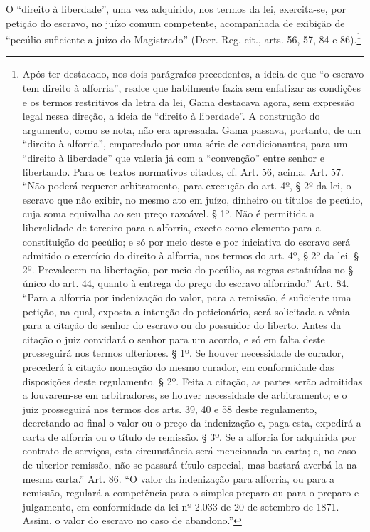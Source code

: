O ``direito à liberdade'', uma vez adquirido, nos termos da lei,
exercita-se, por petição do escravo, no juízo comum competente,
acompanhada de exibição de ``pecúlio suficiente a juízo do Magistrado''
(Decr. Reg. cit., arts. 56, 57, 84 e 86).\footnote{Após ter destacado,
  nos dois parágrafos precedentes, a ideia de que ``o escravo tem direito
  à alforria'', realce que habilmente fazia sem enfatizar as condições e
  os termos restritivos da letra da lei, Gama destacava agora, sem
  expressão legal nessa direção, a ideia de ``direito à liberdade''. A
  construção do argumento, como se nota, não era apressada. Gama
  passava, portanto, de um ``direito à alforria'', emparedado por uma série
  de condicionantes, para um ``direito à liberdade'' que valeria já com a
  ``convenção'' entre senhor e libertando. Para os textos normativos
  citados, cf. Art. 56, acima. Art. 57. ``Não
  poderá requerer arbitramento, para execução do art. 4º, § 2º da lei, o
  escravo que não exibir, no mesmo ato em juízo, dinheiro ou títulos de
  pecúlio, cuja soma equivalha ao seu preço razoável. § 1º. Não é
  permitida a liberalidade de terceiro para a alforria, exceto como
  elemento para a constituição do pecúlio; e só por meio deste e por
  iniciativa do escravo será admitido o exercício do direito à alforria,
  nos termos do art. 4º, § 2º da lei. § 2º. Prevalecem na libertação,
  por meio do pecúlio, as regras estatuídas no § único do art. 44,
  quanto à entrega do preço do escravo alforriado.'' Art. 84. ``Para a
  alforria por indenização do valor, para a remissão, é suficiente uma
  petição, na qual, exposta a intenção do peticionário, será solicitada
  a vênia para a citação do senhor do escravo ou do possuidor do
  liberto. Antes da citação o juiz convidará o senhor para um acordo, e
  só em falta deste prosseguirá nos termos ulteriores. § 1º. Se houver
  necessidade de curador, precederá à citação nomeação do mesmo curador,
  em conformidade das disposições deste regulamento. § 2º. Feita a
  citação, as partes serão admitidas a louvarem-se em arbitradores, se
  houver necessidade de arbitramento; e o juiz prosseguirá nos termos
  dos arts. 39, 40 e 58 deste regulamento, decretando ao final o valor
  ou o preço da indenização e, paga esta, expedirá a carta de alforria
  ou o título de remissão. § 3º. Se a alforria for adquirida por
  contrato de serviços, esta circunstância será mencionada na carta; e,
  no caso de ulterior remissão, não se passará título especial, mas
  bastará averbá-la na mesma carta.'' Art. 86. ``O valor da indenização para
  alforria, ou para a remissão, regulará a competência para o simples
  preparo ou para o preparo e julgamento, em conformidade da lei nº
  2.033 de 20 de setembro de 1871. Assim, o valor do escravo no caso de
  abandono.''}


